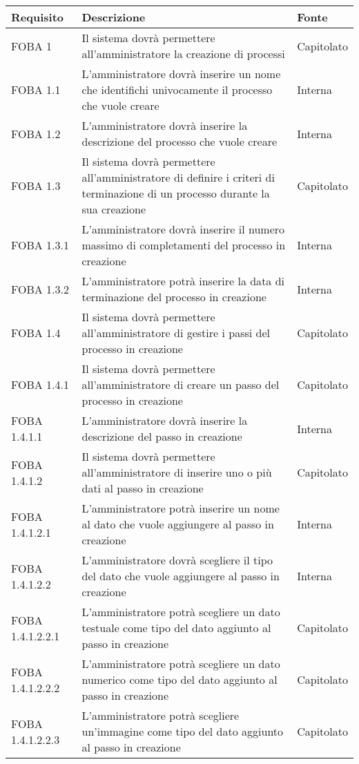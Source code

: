 \begin{longtable}{lXp{}}
\toprule
\textbf{Requisito} & \textbf{Descrizione} & \textbf{Fonte}\\
\midrule
FOBA 1&Il sistema dovrà permettere all'amministratore la creazione di processi&Capitolato\\
\midrule
FOBA 1.1&L'amministratore dovrà inserire un nome che identifichi univocamente il processo che vuole creare&Interna\\
\midrule
FOBA 1.2&L'amministratore dovrà inserire la descrizione del processo che vuole creare &Interna\\
\midrule
FOBA 1.3&Il sistema dovrà permettere all'amministratore di definire i criteri di terminazione di un processo durante la sua creazione&Capitolato\\
\midrule
FOBA 1.3.1&L'amministratore dovrà inserire il numero massimo di completamenti del processo in creazione &Interna\\
\midrule
FOBA 1.3.2&L'amministratore potrà inserire la data di terminazione del processo in creazione&Interna\\
\midrule
FOBA 1.4&Il sistema dovrà permettere all'amministratore di gestire i passi del processo in creazione&Capitolato\\
\midrule
FOBA 1.4.1&Il sistema dovrà permettere all'amministratore di creare un passo del processo in creazione&Capitolato\\
\midrule
FOBA 1.4.1.1&L'amministratore dovrà inserire la descrizione del passo in creazione&Interna\\
\midrule
FOBA 1.4.1.2&Il sistema dovrà permettere all'amministratore di inserire uno o più dati al passo in creazione&Capitolato\\
\midrule
FOBA 1.4.1.2.1&L'amministratore potrà inserire un nome al dato che vuole aggiungere al passo in creazione&Interna\\
\midrule
FOBA 1.4.1.2.2&L'amministratore dovrà scegliere il tipo del dato che vuole aggiungere al passo in creazione&Interna\\
\midrule
FOBA 1.4.1.2.2.1&L'amministratore potrà scegliere un dato testuale come tipo del dato aggiunto al passo in creazione&Capitolato\\
\midrule
FOBA 1.4.1.2.2.2&L'amministratore potrà scegliere un dato numerico come tipo del dato aggiunto al passo in creazione&Capitolato\\
\midrule
FOBA 1.4.1.2.2.3&L'amministratore potrà scegliere un'immagine come tipo del dato aggiunto al passo in creazione&Capitolato\\

\end{longtable}
